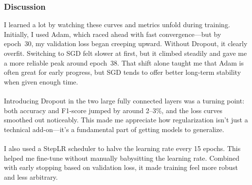 \documentclass[10pt]{article}
\begin{document}
\subsubsection*{Discussion}
I learned a lot by watching these curves and metrics unfold during training. Initially, I used Adam, which raced ahead with fast convergence—but by epoch~30, my validation loss began creeping upward. Without Dropout, it clearly overfit. Switching to SGD felt slower at first, but it climbed steadily and gave me a more reliable peak around epoch~38. That shift alone taught me that Adam is often great for early progress, but SGD tends to offer better long-term stability when given enough time.\\
\\
Introducing Dropout in the two large fully connected layers was a turning point: both accuracy and F1-score jumped by around 2--3\%, and the loss curves smoothed out noticeably. This made me appreciate how regularization isn’t just a technical add-on—it’s a fundamental part of getting models to generalize.\\
\\
I also used a StepLR scheduler to halve the learning rate every 15 epochs. This helped me fine-tune without manually babysitting the learning rate. Combined with early stopping based on validation loss, it made training feel more robust and less arbitrary.
\end{document}
